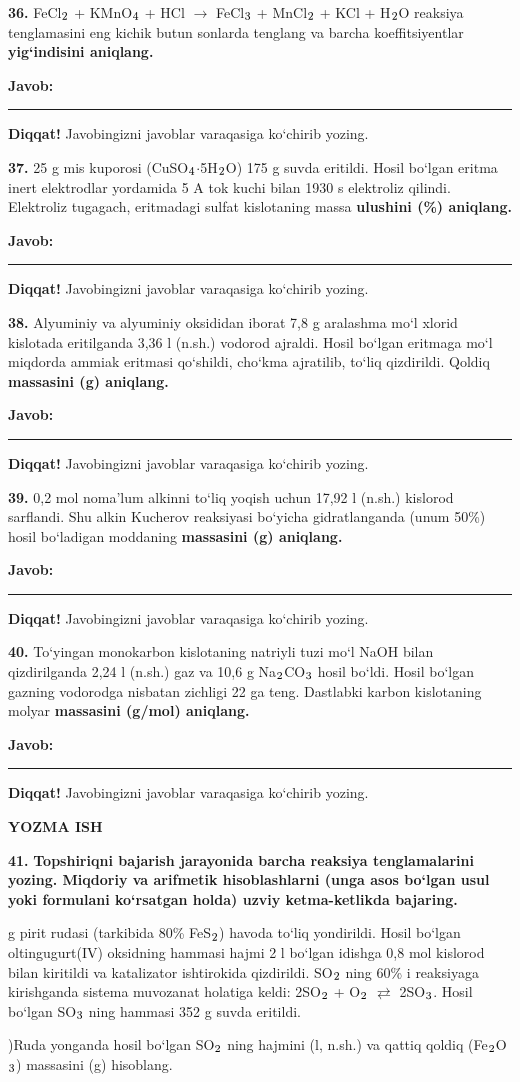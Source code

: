 \documentclass[11pt,a4paper]{article}
\renewcommand{\textsubscript}[1]{\ensuremath{_{\text{\fontsize{8}{8}\selectfont #1}}}}
\newcommand{\javob}{\par\smallskip\noindent\textbf{Javob:} \rule[-2pt]{7.5cm}{0.4pt}\par\smallskip\noindent\textbf{Diqqat!} Javobingizni javoblar varaqasiga ko`chirib yozing.\par\medskip}
\begin{document}
\par\bigskip
\noindent\textbf{36.} FeCl\textsubscript{2} + KMnO\textsubscript{4} + HCl $\to$ FeCl\textsubscript{3} + MnCl\textsubscript{2} + KCl + H\textsubscript{2}O reaksiya tenglamasini eng kichik butun sonlarda tenglang va barcha koeffitsiyentlar \textbf{yig`indisini aniqlang.}
\javob
\noindent\textbf{37.} 25 g mis kuporosi (CuSO\textsubscript{4}$\cdot$5H\textsubscript{2}O) 175 g suvda eritildi. Hosil bo`lgan eritma inert elektrodlar yordamida 5 A tok kuchi bilan 1930 s elektroliz qilindi. Elektroliz tugagach, eritmadagi sulfat kislotaning massa \textbf{ulushini (\%) aniqlang.}
\javob
\noindent\textbf{38.} Alyuminiy va alyuminiy oksididan iborat 7,8 g aralashma mo`l xlorid kislotada eritilganda 3,36 l (n.sh.) vodorod ajraldi. Hosil bo`lgan eritmaga mo`l miqdorda ammiak eritmasi qo`shildi, cho`kma ajratilib, to`liq qizdirildi. Qoldiq \textbf{massasini (g) aniqlang.}
\javob
\noindent\textbf{39.} 0,2 mol noma'lum alkinni to`liq yoqish uchun 17,92 l (n.sh.) kislorod sarflandi. Shu alkin Kucherov reaksiyasi bo`yicha gidratlanganda (unum 50\%) hosil bo`ladigan moddaning \textbf{massasini (g) aniqlang.}
\javob
\noindent\textbf{40.} To`yingan monokarbon kislotaning natriyli tuzi mo`l NaOH bilan qizdirilganda 2,24 l (n.sh.) gaz va 10,6 g Na\textsubscript{2}CO\textsubscript{3} hosil bo`ldi. Hosil bo`lgan gazning vodorodga nisbatan zichligi 22 ga teng. Dastlabki karbon kislotaning molyar \textbf{massasini (g/mol) aniqlang.}
\javob
\par\bigskip\begin{center}\textbf{\fontsize{13}{15}\selectfont YOZMA ISH}\end{center}
\noindent\textbf{41.} \textbf{Topshiriqni bajarish jarayonida barcha reaksiya tenglamalarini yozing. Miqdoriy va arifmetik hisoblashlarni (unga asos bo`lgan usul yoki formulani ko`rsatgan holda) uzviy ketma-ketlikda bajaring.}\par{} g pirit rudasi (tarkibida 80\% FeS\textsubscript{2}) havoda to`liq yondirildi. Hosil bo`lgan oltingugurt(IV) oksidning hammasi hajmi 2 l bo`lgan idishga 0,8 mol kislorod bilan kiritildi va katalizator ishtirokida qizdirildi. SO\textsubscript{2} ning 60\% i reaksiyaga kirishganda sistema muvozanat holatiga keldi: 2SO\textsubscript{2} + O\textsubscript{2} $\rightleftarrows$ 2SO\textsubscript{3}. Hosil bo`lgan SO\textsubscript{3} ning hammasi 352 g suvda eritildi.\par
{})Ruda yonganda hosil bo`lgan SO\textsubscript{2} ning hajmini (l, n.sh.) va qattiq qoldiq (Fe\textsubscript{2}O\textsubscript{3}) massasini (g) hisoblang.\par
\end{document}
